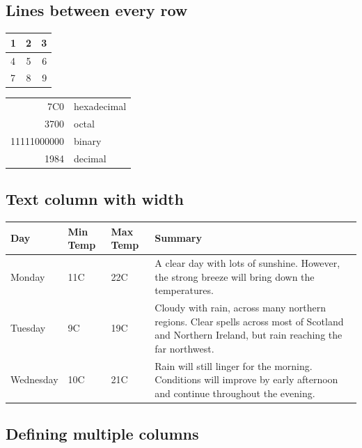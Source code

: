 \documentclass{article}
\begin{document}
  \subsection{Lines between every row}

  \begin{center}
    \begin{tabular}{ l | c | r }
      \hline
      1 & 2 & 3 \\ \hline
      4 & 5 & 6 \\ \hline
      7 & 8 & 9 \\
      \hline
    \end{tabular}
  \end{center}

  \begin{tabular}{|r|l|}
    \hline
    7C0 & hexadecimal \\
    3700 & octal \\ \cline{2-2}
    11111000000 & binary \\
    \hline \hline
    1984 & decimal \\
    \hline
  \end{tabular}

  \subsection{Text column with width}

  \begin{center}
    \begin{tabular}{ | l | l | l | p{5cm} |}
      \hline
      Day & Min Temp & Max Temp & Summary \\ \hline
      Monday & 11C & 22C & A clear day with lots of sunshine.
      However, the strong breeze will bring down the temperatures. \\ \hline
      Tuesday & 9C & 19C & Cloudy with rain, across many northern regions. Clear spells
      across most of Scotland and Northern Ireland,
      but rain reaching the far northwest. \\ \hline
      Wednesday & 10C & 21C & Rain will still linger for the morning.
      Conditions will improve by early afternoon and continue
      throughout the evening. \\
      \hline
    \end{tabular}
  \end{center}

  \subsection{Defining multiple columns}
\end{document}

